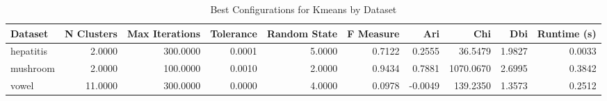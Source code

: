 \begin{table*}[ht!]
\caption{Best Configurations for Kmeans by Dataset}
\label{tab:best_configs_kmeans}
\begin{tabular}{lrrrrrrrrr}
Dataset & N Clusters & Max Iterations & Tolerance & Random State & F Measure & Ari & Chi & Dbi & Runtime (s) \\\midrule

hepatitis & 2.0000 & 300.0000 & 0.0001 & 5.0000 & 0.7122 & 0.2555 & 36.5479 & 1.9827 & 0.0033 \\
mushroom & 2.0000 & 100.0000 & 0.0010 & 2.0000 & 0.9434 & 0.7881 & 1070.0670 & 2.6995 & 0.3842 \\
vowel & 11.0000 & 300.0000 & 0.0000 & 4.0000 & 0.0978 & -0.0049 & 139.2350 & 1.3573 & 0.2512 \\
\end{tabular}
\end{table*}
